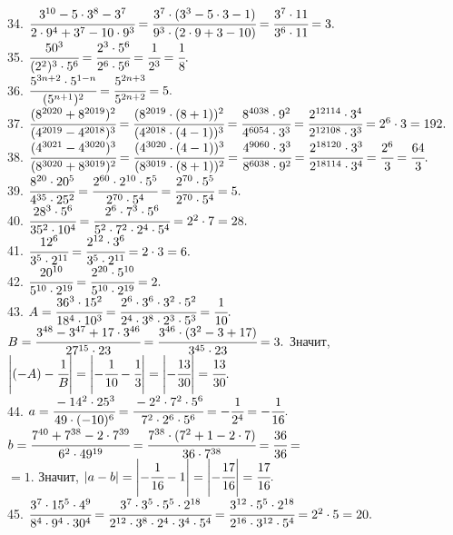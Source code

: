 \documentclass[12pt]{article}
\begin{document}
34. $\cfrac{3^{10}-5\cdot3^8-3^7}{2\cdot9^4+3^7-10\cdot9^3}=\cfrac{3^7\cdot(3^3-5\cdot3-1)}{9^3\cdot(2\cdot9+3-10)}=
\cfrac{3^7\cdot11}{3^6\cdot11}=3.$\\
35. $\cfrac{50^3}{(2^2)^3\cdot5^6}=\cfrac{2^3\cdot5^6}{2^6\cdot5^6}=\cfrac{1}{2^3}=\cfrac{1}{8}.$\\
36. $\cfrac{5^{3n+2}\cdot5^{1-n}}{(5^{n+1})^2}=\cfrac{5^{2n+3}}{5^{2n+2}}=5.$\\
37. $\cfrac{(8^{2020}+8^{2019})^2}{(4^{2019}-4^{2018})^3}=\cfrac{(8^{2019}\cdot(8+1))^2}{(4^{2018}\cdot(4-1))^3}=
\cfrac{8^{4038}\cdot9^2}{4^{6054}\cdot3^3}=\cfrac{2^{12114}\cdot3^4}{2^{12108}\cdot3^3}=2^6\cdot3=192.$\\
38. $\cfrac{(4^{3021}-4^{3020})^3}{(8^{3020}+8^{3019})^2}=\cfrac{(4^{3020}\cdot(4-1))^3}{(8^{3019}\cdot(8+1))^2}=
\cfrac{4^{9060}\cdot3^3}{8^{6038}\cdot9^2}=\cfrac{2^{18120}\cdot3^3}{2^{18114}\cdot3^4}=\cfrac{2^6}{3}=\cfrac{64}{3}.$\\
39. $\cfrac{8^{20}\cdot20^5}{4^{35}\cdot25^2}=\cfrac{2^{60}\cdot2^{10}\cdot5^5}{2^{70}\cdot5^4}=
\cfrac{2^{70}\cdot5^5}{2^{70}\cdot5^4}=5.$\\
40. $\cfrac{28^3\cdot5^6}{35^2\cdot10^4}=\cfrac{2^6\cdot7^3\cdot5^6}{5^2\cdot7^2\cdot2^4\cdot5^4}=2^2\cdot7=28.$\\
41. $\cfrac{12^6}{3^5\cdot2^{11}}=\cfrac{2^{12}\cdot3^6}{3^5\cdot2^{11}}=2\cdot3=6.$\\
42. $\cfrac{20^{10}}{5^{10}\cdot2^{19}}=\cfrac{2^{20}\cdot5^{10}}{5^{10}\cdot2^{19}}=2.$\\
43. $A=\cfrac{36^3\cdot15^2}{18^4\cdot10^3}=\cfrac{2^6\cdot3^6\cdot3^2\cdot5^2}{2^4\cdot3^8\cdot2^3\cdot5^3}=\cfrac{1}{10}.$
$B=\cfrac{3^{48}-3^{47}+17\cdot3^{46}}{27^{15}\cdot23}=\cfrac{3^{46}\cdot(3^2-3+17)}{3^{45}\cdot23}=3.$ Значит, $\left|(-A)-\cfrac{1}{B}\right|=
\left|-\cfrac{1}{10}-\cfrac{1}{3}\right|=\left|-\cfrac{13}{30}\right|=\cfrac{13}{30}.$\\
44. $a=\cfrac{-14^2\cdot25^3}{49\cdot(-10)^6}=\cfrac{-2^2\cdot7^2\cdot5^6}{7^2\cdot2^6\cdot5^6}=-\cfrac{1}{2^4}=-\cfrac{1}{16}.$
$b=\cfrac{7^{40}+7^{38}-2\cdot7^{39}}{6^2\cdot49^{19}}=\cfrac{7^{38}\cdot(7^2+1-2\cdot7)}{36\cdot7^{38}}=
\cfrac{36}{36}=$\\$=1.$ Значит, $|a-b|=\left|-\cfrac{1}{16}-1\right|=\left|-\cfrac{17}{16}\right|=\cfrac{17}{16}.$\\
45. $\cfrac{3^7\cdot15^5\cdot4^9}{8^4\cdot9^4\cdot30^4}=\cfrac{3^7\cdot3^5\cdot5^5\cdot2^{18}}{2^{12}\cdot3^8\cdot2^4\cdot3^4\cdot5^4}=
\cfrac{3^{12}\cdot5^5\cdot2^{18}}{2^{16}\cdot3^{12}\cdot5^4}=2^2\cdot5=20.$\\
\end{document}
